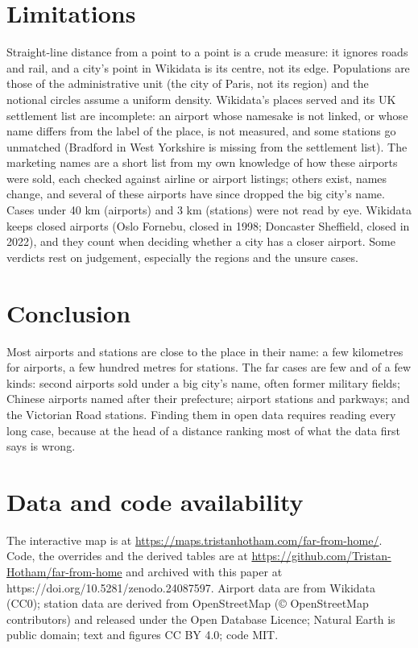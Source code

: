\documentclass[11pt,a4paper]{article}
\begin{document}
\section{Limitations}
Straight-line distance from a point to a point is a crude measure: it ignores roads and rail, and a city's point in Wikidata is its centre, not its edge. Populations are those of the administrative unit (the city of Paris, not its region) and the notional circles assume a uniform density. Wikidata's places served and its UK settlement list are incomplete: an airport whose namesake is not linked, or whose name differs from the label of the place, is not measured, and some stations go unmatched (Bradford in West Yorkshire is missing from the settlement list). The marketing names are a short list from my own knowledge of how these airports were sold, each checked against airline or airport listings; others exist, names change, and several of these airports have since dropped the big city's name. Cases under 40 km (airports) and 3 km (stations) were not read by eye. Wikidata keeps closed airports (Oslo Fornebu, closed in 1998; Doncaster Sheffield, closed in 2022), and they count when deciding whether a city has a closer airport. Some verdicts rest on judgement, especially the regions and the unsure cases.

\section{Conclusion}
Most airports and stations are close to the place in their name: a few kilometres for airports, a few hundred metres for stations. The far cases are few and of a few kinds: second airports sold under a big city's name, often former military fields; Chinese airports named after their prefecture; airport stations and parkways; and the Victorian Road stations. Finding them in open data requires reading every long case, because at the head of a distance ranking most of what the data first says is wrong.

\section*{Data and code availability}
The interactive map is at \url{https://maps.tristanhotham.com/far-from-home/}. Code, the overrides and the derived tables are at \url{https://github.com/Tristan-Hotham/far-from-home} and archived with this paper at https://doi.org/10.5281/zenodo.24087597. Airport data are from Wikidata (CC0); station data are derived from OpenStreetMap (\copyright{} OpenStreetMap contributors) and released under the Open Database Licence; Natural Earth is public domain; text and figures CC BY 4.0; code MIT.
\end{document}
